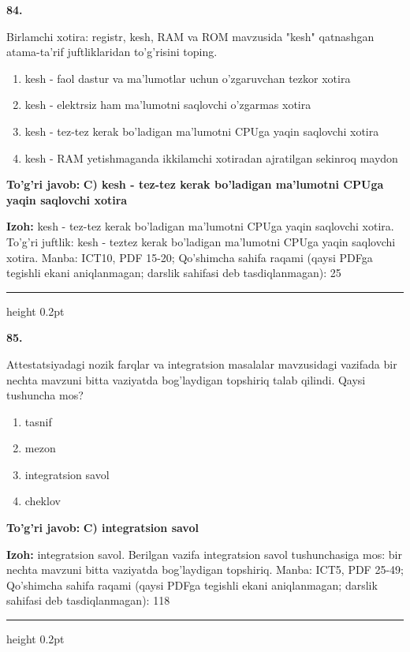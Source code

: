 \documentclass[10pt,a4paper]{article}
\begin{document}
{\bfseries\sffamily\color{ink} 84.}
\par
Birlamchi xotira: registr, kesh, RAM va ROM mavzusida "kesh" qatnashgan atama-ta'rif juftliklaridan to'g'risini toping.
\begin{enumerate}[label=\Alph*),leftmargin=9mm]
\item kesh - faol dastur va ma'lumotlar uchun o'zgaruvchan tezkor xotira
\item kesh - elektrsiz ham ma'lumotni saqlovchi o'zgarmas xotira
\item kesh - tez-tez kerak bo'ladigan ma'lumotni CPUga yaqin saqlovchi xotira
\item kesh - RAM yetishmaganda ikkilamchi xotiradan ajratilgan sekinroq maydon
\end{enumerate}
\begin{tcolorbox}[enhanced,breakable,colback=teal!4,colframe=teal!60!black,boxrule=0.45pt,arc=1.2mm,left=2.7mm,right=2.7mm,top=1.8mm,bottom=1.8mm,before skip=2mm,after skip=2mm]
{\bfseries\sffamily\color{teal}To'g'ri javob:} \textbf{C) kesh - tez-tez kerak bo'ladigan ma'lumotni CPUga yaqin saqlovchi xotira}
\par\smallskip
{\bfseries Izoh:} kesh - tez-tez kerak bo'ladigan ma'lumotni CPUga yaqin saqlovchi xotira. To'g'ri juftlik: kesh - teztez kerak bo'ladigan ma'lumotni CPUga yaqin saqlovchi xotira. Manba: ICT10, PDF 15-20; Qo'shimcha sahifa raqami (qaysi PDFga tegishli ekani aniqlanmagan; darslik sahifasi deb tasdiqlanmagan): 25
\end{tcolorbox}
\vspace{2mm}\hrule height 0.2pt\vspace{3mm}

{\bfseries\sffamily\color{ink} 85.}
\par
Attestatsiyadagi nozik farqlar va integratsion masalalar mavzusidagi vazifada bir nechta mavzuni bitta vaziyatda bog'laydigan topshiriq talab qilindi. Qaysi tushuncha mos?
\begin{enumerate}[label=\Alph*),leftmargin=9mm]
\item tasnif
\item mezon
\item integratsion savol
\item cheklov
\end{enumerate}
\begin{tcolorbox}[enhanced,breakable,colback=teal!4,colframe=teal!60!black,boxrule=0.45pt,arc=1.2mm,left=2.7mm,right=2.7mm,top=1.8mm,bottom=1.8mm,before skip=2mm,after skip=2mm]
{\bfseries\sffamily\color{teal}To'g'ri javob:} \textbf{C) integratsion savol}
\par\smallskip
{\bfseries Izoh:} integratsion savol. Berilgan vazifa integratsion savol tushunchasiga mos: bir nechta mavzuni bitta vaziyatda bog'laydigan topshiriq. Manba: ICT5, PDF 25-49; Qo'shimcha sahifa raqami (qaysi PDFga tegishli ekani aniqlanmagan; darslik sahifasi deb tasdiqlanmagan): 118
\end{tcolorbox}
\vspace{2mm}\hrule height 0.2pt\vspace{3mm}
\end{document}
